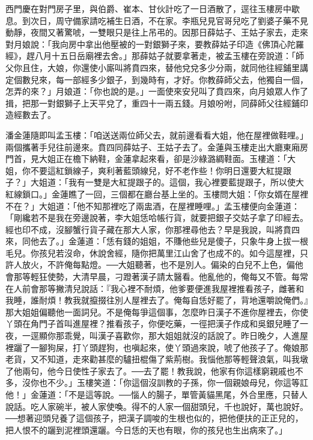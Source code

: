 西門慶在對門房子里，與伯爵、崔本、甘伙計吃了一日酒散了，逕往玉樓房中歇息。到次日，周守備家請吃補生日酒，不在家。李瓶兒見官哥兒吃了劉婆子藥不見動靜，夜間又著驚唬，一雙眼只是往上吊弔的。因那日薛姑子、王姑子家去，走來對月娘說：「我向房中拿出他壓被的一對銀獅子來，要教薛姑子印造《佛頂心陀羅經》，趕八月十五日岳廟裡去舍。」那薛姑子就要拿著走，被孟玉樓在旁說道：「師父你且住，大娘，你還使小廝叫將賁四來，替他兌兌多少分兩，就同他往經鋪里講定個數兒來，每一部經多少銀子，到幾時有，才好。你教薛師父去，他獨自一個，怎弄的來？」月娘道：「你也說的是。」一面使來安兒叫了賁四來，向月娘眾人作了揖，把那一對銀獅子上天平兌了，重四十一兩五錢。月娘吩咐，同薛師父往經鋪印造經數去了。

潘金蓮隨即叫孟玉樓：「咱送送兩位師父去，就前邊看看大姐，他在屋裡做鞋哩。」兩個攜著手兒往前邊來。賁四同薛姑子、王姑子去了。金蓮與玉樓走出大廳東廂房門首，見大姐正在檐下納鞋，金蓮拿起來看，卻是沙綠潞綢鞋面。玉樓道：「大姐，你不要這紅鎖線子，爽利著藍頭線兒，好不老作些！你明日還要大紅提跟子？」大姐道：「我有一雙是大紅提跟子的。這個，我心裡要藍提跟子，所以使大紅線鎖口。」金蓮瞧了一回，三個都在廳台基上坐的。玉樓問大姐：「你女婿在屋裡不在？」大姐道：「他不知那裡吃了兩盅酒，在屋裡睡哩。」孟玉樓便向金蓮道：「剛纔若不是我在旁邊說著，李大姐恁哈帳行貨，就要把銀子交姑子拿了印經去。經也印不成，沒腳蟹行貨子藏在那大人家，你那裡尋他去？早是我說，叫將賁四來，同他去了。」金蓮道：「恁有錢的姐姐，不賺他些兒是傻子，只象牛身上拔一根毛兒。你孩兒若沒命，休說舍經，隨你把萬里江山舍了也成不的。如今這屋裡，只許人放火，不許俺每點燈。──大姐聽著，也不是別人。偏染的白兒不上色，偏他會那等輕狂使勢，大清早晨，刁蹬著漢子請太醫看。他亂他的，俺每又不管。每常在人前會那等撇清兒說話：『我心裡不耐煩，他爹要便進我屋裡推看孩子，雌著和我睡，誰耐煩！教我就攛掇往別人屋裡去了。俺每自恁好罷了，背地還嚼說俺們。』那大姐姐偏聽他一面詞兒。不是俺每爭這個事，怎麼昨日漢子不進你屋裡去，你使丫頭在角門子首叫進屋裡？推看孩子，你便吃藥，一徑把漢子作成和吳銀兒睡了一夜，一逕顯你那乖覺，叫漢子喜歡你，那大姐姐就沒的話說了。昨日晚夕，人進屋裡躧了一腳狗屎，打丫頭趕狗，也嗔起來，使丫頭過來說，唬了他孩子了。俺娘那老貨，又不知道，走來勸甚麼的驢扭棍傷了紫荊樹。我惱他那等輕聲浪氣，叫我墩了他兩句，他今日使性子家去了。──去了罷！教我說，他家有你這樣窮親戚也不多，沒你也不少。」玉樓笑道：「你這個沒訓教的子孫，你一個親娘母兒，你這等訌他！」金蓮道：「不是這等說。──惱人的腸子，單管黃貓黑尾，外合里應，只替人說話。吃人家碗半，被人家使喚。得不的人家一個甜頭兒，千也說好，萬也說好。──想著迎頭兒養了這個孩子，把漢子調唆的生根也似的，把他便扶的正正兒的，把人恨不的躧到泥裡頭還躧。今日恁的天也有眼，你的孩兒也生出病來了。」

